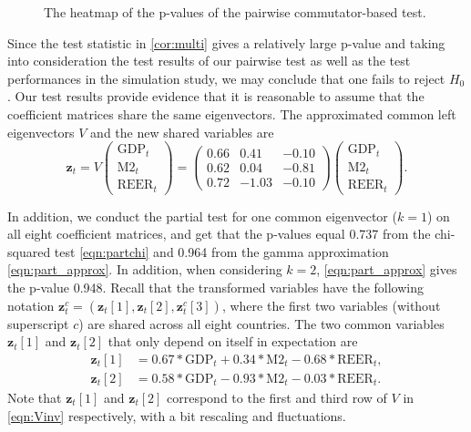 \documentclass[12pt]{article}
\numberwithin{thm}{section}
\numberwithin{defn}{section}
\numberwithin{lem}{section}
\numberwithin{prop}{section}
\numberwithin{cor}{section}
\numberwithin{rem}{section}
\begin{document}
\begin{figure}[htb]
    \centering
    \centerline{}
    \caption{The heatmap of the p-values of the pairwise commutator-based test.}
    \label{fig:pairP}
\end{figure}

Since the test statistic in \autoref{cor:multi} gives a relatively large p-value and taking into consideration the test results of our pairwise test as well as the test performances in the simulation study, we may conclude that one fails to reject $H_0$. Our test results provide evidence that it is reasonable to assume that the coefficient matrices share the same eigenvectors. The approximated common left eigenvectors $V$ and the new shared variables are
\begin{equation}
    \bm{z}_t = V  \begin{pmatrix} \mbox{GDP}_t \\ \mbox{M2}_t \\ \mbox{REER}_t \end{pmatrix} = \begin{pmatrix} 0.66 & 0.41 & -0.10 \\
    0.62 & 0.04 & -0.81\\
    0.72 & -1.03 & -0.10\end{pmatrix} \begin{pmatrix} \mbox{GDP}_t \\ \mbox{M2}_t \\ \mbox{REER}_t \end{pmatrix}.\label{eqn:Vinv}
\end{equation}

In addition, we conduct the partial test for one common eigenvector ($k=1$) on all eight coefficient matrices, and get that the p-values equal 0.737 from the chi-squared test \eqref{eqn:partchi} and 0.964 from the gamma approximation \eqref{eqn:part_approx}. In addition, when considering $k = 2$, \eqref{eqn:part_approx} gives the p-value 0.948. Recall that the transformed variables have the following notation $\bm{z}_t^c = (\bm{z}_t[1], \bm{z}_t[2], \bm{z}_t^c[3])$, where the first two variables (without superscript $c$) are shared across all eight countries. The two common variables $\bm{z}_t[1]$ and $\bm{z}_t[2]$ that only depend on itself in expectation are
\begin{align*}
    \bm{z}_t[1] & = 0.67 * \mbox{GDP}_t + 0.34 * \mbox{M2}_t - 0.68 * \mbox{REER}_t,\\
    \bm{z}_t[2] & = 0.58 * \mbox{GDP}_t - 0.93 * \mbox{M2}_t - 0.03 * \mbox{REER}_t.
\end{align*}
Note that $\bm{z}_t[1]$ and $\bm{z}_t[2]$ correspond to the first and third row of $V$ in \eqref{eqn:Vinv} respectively, with a bit rescaling and fluctuations.
\end{document}
